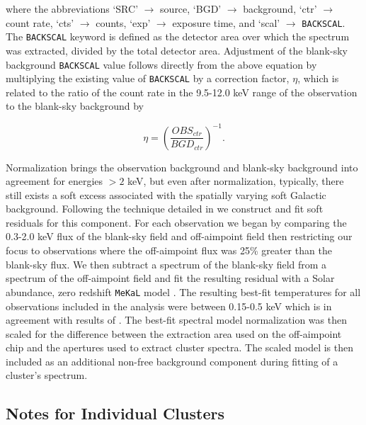 \documentclass{emulateapj}
\begin{document}
where the abbreviations `SRC' $\rightarrow$ source, `BGD' $\rightarrow$
background, `ctr' $\rightarrow$ count rate, `cts' $\rightarrow$
counts, `exp' $\rightarrow$ exposure time, and `scal' $\rightarrow$
{\tt BACKSCAL}. The {\tt BACKSCAL} keyword is defined as the detector area over
which the spectrum was extracted, divided by the total detector
area. Adjustment of the blank-sky background {\tt BACKSCAL} value
follows directly from the above equation by multiplying the existing
value of {\tt BACKSCAL} by a correction factor, $\eta$, which is
related to the ratio of the count rate in the 9.5-12.0 keV range of
the observation to the blank-sky background by

\begin{equation}
\eta = (\frac{OBS_{ctr}}{BGD_{ctr}})^{-1}.
\end{equation}

Normalization brings the observation background and blank-sky
background into agreement for energies $> 2$ keV, but even after
normalization, typically, there still exists a soft excess associated
with the spatially varying soft Galactic background. Following the
technique detailed in \cite{2005ApJ...628..655V} we construct and fit
soft residuals for this component. For each observation we began by comparing
the 0.3-2.0 keV flux of the blank-sky field and off-aimpoint field then
restricting our focus to observations where the off-aimpoint flux
was 25\% greater than the blank-sky flux.  We then
subtract a spectrum of the blank-sky field from a spectrum of the off-aimpoint
field and fit the resulting residual with a Solar abundance, zero
redshift {\tt MeKaL} model \citep{1985A&AS...62..197M, 1986A&AS...65..511M,
1992SRON, 1995ApJ...438L.115L}. The resulting
best-fit temperatures for all observations included in the analysis
were between 0.15-0.5 keV which is in agreement with results of
\cite{2005ApJ...628..655V}. The best-fit spectral model normalization was then
scaled for the difference between the extraction area used on the off-aimpoint chip
and the apertures used to extract cluster spectra. The scaled model is then
included as an additional non-free background component during fitting
of a cluster's spectrum.

\subsection{Notes for Individual Clusters} \label{sec:indnotes}
\end{document}
